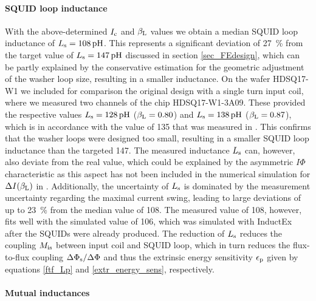 \paragraph{SQUID loop inductance }

With the above-determined $I_{\rm c}$ and $\beta_{\rm L}$ values we obtain a median SQUID loop inductance of  $L_{\rm s}=\qty{108}{\pico\henry}$. This represents a significant deviation of \qty{27}{\percent} from the target value of $L_{\rm s}=\qty{147}{\pico\henry}$ discussed in section \ref{sec_FEdesign}, which can be partly explained by the conservative estimation for the geometric adjustment of the washer loop size, resulting in a smaller inductance. On the wafer HDSQ17-W1 we included for comparison the original design \cite{Bauer2022} with a single turn input coil, where we measured two channels of the chip HDSQ17-W1-3A09. These provided the respective values $L_{\rm s}=\qty{128}{\pico\henry}$ ($\beta_{\rm L}=0.80$) and $L_{\rm s}=\qty{138}{\pico\henry}$ ($\beta_{\rm L}=0.87$), which is in accordance with the value of \qty{135}{\pH} that was measured in \cite{Bauer2022}. This confirms that the washer loops were designed too small, resulting in a smaller SQUID loop inductance than the targeted \qty{147}{\pH}. 
The measured inductance $L_{\rm s}$ can, however, also deviate from the real value, which could be explained by the asymmetric $I\Phi$ characteristic as this aspect has not been included in the numerical simulation for $\Delta I(\beta_{\rm L})$ in \cite{Tesche1977}. Additionally, the uncertainty of $L_{\rm s}$ is dominated by the measurement uncertainty regarding the maximal current swing, leading to large deviations of up to \qty{23}{\percent} from the median value of \qty{108}{\pH}.  
The measured value of \qty{108}{\pH}, however, fits well with the simulated value of \qty{106}{\pH}, which was simulated with InductEx after the SQUIDs were already produced. The reduction of $L_{\rm s}$ reduces the coupling $M_{\rm is}$ between input coil and SQUID loop, which in turn reduces the flux-to-flux coupling $\Delta\Phi_{\rm s}/\Delta\Phi$ and thus the extrinsic energy sensitivity $\epsilon_{\rm p}$ given by equations \ref{ftf_Lp} and \ref{extr_energy_sens}, respectively.
 
\paragraph{Mutual inductances}
 
